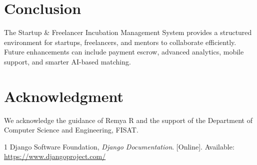 ﻿\documentclass[journal]{IEEEtran}
\begin{document}
\section{Conclusion}
The Startup \& Freelancer Incubation Management System provides a structured environment for startups, freelancers, and mentors to collaborate efficiently. Future enhancements can include payment escrow, advanced analytics, mobile support, and smarter AI-based matching.

\section*{Acknowledgment}
We acknowledge the guidance of Remya R and the support of the Department of Computer Science and Engineering, FISAT.

\begin{thebibliography}{1}
Django Software Foundation, \emph{Django Documentation}. [Online]. Available: \url{https://www.djangoproject.com/}
\end{thebibliography}
\end{document}
